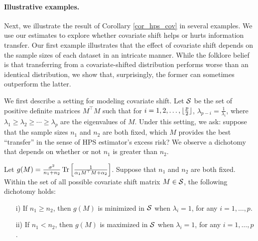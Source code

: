 \paragraph{Illustrative examples.} Next, we illustrate the result of Corollary \ref{cor_hps_cov} in several examples.
We use our estimates to explore whether covariate shift helps or hurts information transfer.
Our first example illustrates that the effect of covariate shift depends on the sample sizes of each dataset in an intricate manner.
    While the folklore belief is that transferring from a covariate-shifted distribution performs worse than an identical distribution, we show that, surprisingly, the former can sometimes outperform the latter.
    
    We first describe a setting for modeling covariate shift.
    Let $\mathcal{S}$ be the set of positive definite matrices $M^{\top} M$ such that for $i = 1,2,\dots,\lfloor {\frac p 2} \rfloor$, $\lambda_{p - i}  = \frac 1 {\lambda_i}$, where $\lambda_1 \ge \lambda_2 \ge \cdots \ge \lambda_p$ are the eigenvalues of $M$.
    Under this setting, we ask: suppose that the sample sizes $n_1$ and $n_2$ are both fixed, which $M$ provides the best ``transfer'' in the sense of HPS estimator's excess risk?
    We observe a dichotomy that depends on whether or not $n_1$ is greater than $n_2$.
    \begin{proposition}\label{claim_dichotomy}
        Let $g(M) = \frac{\sigma^2}{n_1 + n_2} \operatorname{Tr}\left[\frac 1 {\alpha_1 M^{\top} M + \alpha_2}\right]$.
        Suppose that $n_1$ and $n_2$ are both fixed.
        Within the set of all possible covariate shift matrix $M\in\mathcal{S}$, the following dichotomy holds:
        \begin{enumerate}
	        \item[i)] If $n_1 \ge n_2$, then $g(M)$ is minimized in $\mathcal{S}$ when $\lambda_i = 1$, for any $i = 1,\dots,p$.
	        \item[ii)] If $n_1 < n_2$, then $g(M)$ is maximized in $\mathcal{S}$ when $\lambda_i = 1$, for any $i = 1,\dots,p$.
        \end{enumerate}
    \end{proposition}

